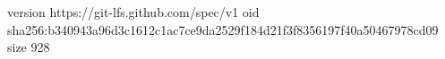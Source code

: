 version https://git-lfs.github.com/spec/v1
oid sha256:b340943a96d3c1612c1ac7ce9da2529f184d21f3f8356197f40a50467978cd09
size 928
